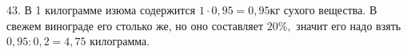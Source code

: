 43. В 1 килограмме изюма содержится $1\cdot0,95=0,95$кг сухого вещества. В свежем винограде его столько же, но оно составляет $20\%,$ значит его надо взять
$0,95:0,2=4,75$ килограмма.\\
